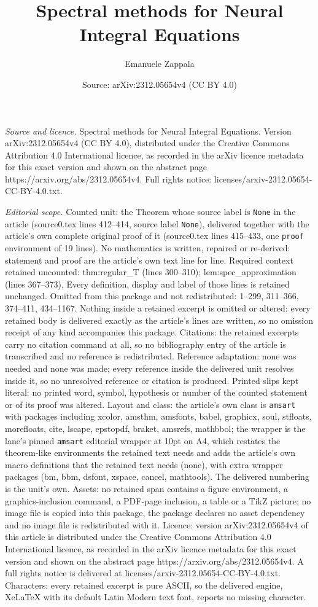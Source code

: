 \documentclass[10pt,a4paper]{amsart}
\title[Spectral methods for Neural Integral Equations]{Spectral methods for Neural Integral Equations}
\author{Emanuele Zappala}
\date{Source: arXiv:2312.05654v4 (CC BY 4.0)}
\begin{document}
\maketitle

\noindent\emph{Source and licence.} Spectral methods for Neural Integral Equations. Version arXiv:2312.05654v4 (CC BY 4.0), distributed under the Creative Commons Attribution 4.0 International licence, as recorded in the arXiv licence metadata for this exact version and shown on the abstract page https://arxiv.org/abs/2312.05654v4. Full rights notice: licenses/arxiv-2312.05654-CC-BY-4.0.txt.\par\smallskip

\noindent\textit{Editorial scope.} Counted unit: the Theorem whose source label is \texttt{None} in the article (source0.tex lines 412--414, source label \texttt{None}), delivered together with the article's own complete original proof of it (source0.tex lines 415--433, one \texttt{proof} environment of 19 lines). No mathematics is written, repaired or re-derived: statement and proof are the article's own text line for line. Required context retained uncounted: thm:regular\_T (lines 300--310); lem:spec\_approximation (lines 367--373). Every definition, display and label of those lines is retained unchanged. Omitted from this package and not redistributed: 1--299, 311--366, 374--411, 434--1167. Nothing inside a retained excerpt is omitted or altered: every retained body is delivered exactly as the article's lines are written, so no omission receipt of any kind accompanies this package. Citations: the retained excerpts carry no citation command at all, so no bibliography entry of the article is transcribed and no reference is redistributed. Reference adaptation: none was needed and none was made; every reference inside the delivered unit resolves inside it, so no unresolved reference or citation is produced. Printed slips kept literal: no printed word, symbol, hypothesis or number of the counted statement or of its proof was altered. Layout and class: the article's own class is \texttt{amsart} with packages including xcolor, amsthm, amsfonts, babel, graphicx, soul, stfloats, morefloats, cite, lscape, epstopdf, braket, amsrefs, mathbbol; the wrapper is the lane's pinned \texttt{amsart} editorial wrapper at 10pt on A4, which restates the theorem-like environments the retained text needs and adds the article's own macro definitions that the retained text needs (none), with extra wrapper packages (bm, bbm, dsfont, xspace, cancel, mathtools). The delivered numbering is the unit's own. Assets: no retained span contains a figure environment, a graphics-inclusion command, a PDF-page inclusion, a table or a TikZ picture; no image file is copied into this package, the package declares no asset dependency and no image file is redistributed with it. Licence: version arXiv:2312.05654v4 of this article is distributed under the Creative Commons Attribution 4.0 International licence, as recorded in the arXiv licence metadata for this exact version and shown on the abstract page https://arxiv.org/abs/2312.05654v4. A full rights notice is delivered at licenses/arxiv-2312.05654-CC-BY-4.0.txt. Characters: every retained excerpt is pure ASCII, so the delivered engine, XeLaTeX with its default Latin Modern text font, reports no missing character.
\end{document}
